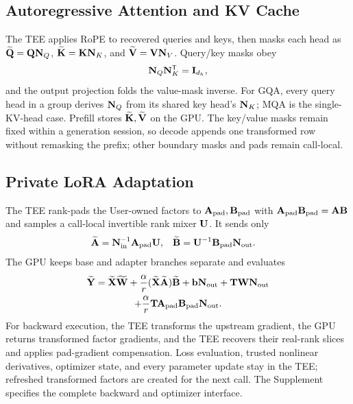\subsection{Autoregressive Attention and KV Cache}
\label{subsec:attention-execution}

The TEE applies RoPE to recovered queries and keys, then masks each head as
$\widetilde{\mathbf{Q}}=\mathbf{Q}\mathbf{N}_{Q}$, $\widetilde{\mathbf{K}}=\mathbf{K}\mathbf{N}_{K}$, and $\widetilde{\mathbf{V}}=\mathbf{V}\mathbf{N}_{V}$. Query/key masks obey
\begin{equation}
\mathbf{N}_{Q}\mathbf{N}_{K}^{\mathsf T}=\mathbf I_{d_h},
\label{eq:method-attention}
\end{equation}
and the output projection folds the value-mask inverse. For GQA, every query
head in a group derives $\mathbf{N}_{Q}$ from its shared key head's $\mathbf{N}_{K}$; MQA is the
single-KV-head case. Prefill stores $\widetilde{\mathbf{K}},\widetilde{\mathbf{V}}$ on the GPU. The key/value masks
remain fixed within a generation session, so decode appends one transformed row
without remasking the prefix; other boundary masks and pads remain call-local.

\subsection{Private LoRA Adaptation}
\label{subsec:lora-adaptation}

The TEE rank-pads the User-owned factors to $\mathbf{A}_{\mathrm{pad}},\mathbf{B}_{\mathrm{pad}}$ with
$\mathbf{A}_{\mathrm{pad}}\mathbf{B}_{\mathrm{pad}}=\mathbf{A}\mathbf{B}$ and samples a call-local invertible rank mixer
$\mathbf{U}$. It sends only
\begin{align}
\widetilde{\mathbf{A}}&=\mathbf{N}_{\mathrm{in}}^{-1}\mathbf{A}_{\mathrm{pad}}\mathbf{U},&
\widetilde{\mathbf{B}}&=\mathbf{U}^{-1}\mathbf{B}_{\mathrm{pad}}\mathbf{N}_{\mathrm{out}}.
\label{eq:method-lora-factors}
\end{align}
The GPU keeps base and adapter branches separate and evaluates
\begin{multline}
\widetilde{\mathbf{Y}}=\widetilde{\mathbf{X}}\widetilde{\mathbf{W}}+\frac{\alpha}{r}(\widetilde{\mathbf{X}}\widetilde{\mathbf{A}})\widetilde{\mathbf{B}}+\mathbf{b}\mathbf{N}_{\mathrm{out}}+\mathbf{T}\mathbf{W}\mathbf{N}_{\mathrm{out}}\\
+\frac{\alpha}{r}\mathbf{T}\mathbf{A}_{\mathrm{pad}}\mathbf{B}_{\mathrm{pad}}\mathbf{N}_{\mathrm{out}}.
\label{eq:method-lora-forward}
\end{multline}
For backward execution, the TEE transforms the upstream gradient, the GPU
returns transformed factor gradients, and the TEE recovers their real-rank
slices and applies pad-gradient compensation. Loss evaluation, trusted
nonlinear derivatives, optimizer state, and every parameter update stay in the
TEE; refreshed transformed factors are created for the next call. The
Supplement specifies the complete backward and optimizer interface.

